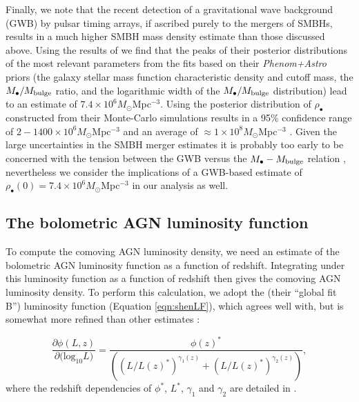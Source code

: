 \documentclass[twocolumn]{aastex631}
\begin{document}
Finally, we note that the recent detection of a gravitational wave background (GWB) by pulsar timing arrays, if ascribed purely to the mergers of SMBHs, results in a much higher SMBH mass density estimate than those discussed above. Using the results of \citet{nanograv23} we find that the peaks of their posterior distributions of the most relevant parameters from the fits based on their {\em Phenom+Astro} priors
(the galaxy stellar mass function characteristic density and cutoff mass, the $M_{\bullet}/M_{\rm bulge}$ ratio, and the logarithmic width of the $M_{\bullet}/M_{\rm bulge}$ distribution) lead to an estimate of $7.4\times 10^6 M_{\odot}$Mpc$^{-3}$. Using the posterior distribution of $\rho_{\bullet}$ constructed from their Monte-Carlo simulations results in a 95\% confidence range of $2-1400 \times 10^6 M_{\odot}$Mpc$^{-3}$ and an average of $\approx 1\times 10^8 M_{\odot}$Mpc$^{-3}$ \citep[we note also that][found a similar result using the earlier 12.5 yr NanoGrav data release]{2022ApJ...924...93C}. Given the large uncertainties in the SMBH merger estimates it is probably too early to be concerned with the tension between the GWB versus the $M_{\bullet} - M_{\rm bulge}$ relation \citep[see][for a discussion of the strength of the tension between the SMBH binary model and the measured GWB in the context of new physics]{2023ApJ...951L..11A}, nevertheless we consider the implications of a GWB-based estimate of $\rho_{\bullet}(0)=7.4\times 10^6 M_{\odot}$Mpc$^{-3}$ in our analysis as well. 


\subsection{The bolometric AGN luminosity function}\label{sec:LF}

To compute the comoving AGN luminosity density, we need an estimate of the bolometric AGN luminosity function as a function of redshift. Integrating under this luminosity function as a function of redshift then gives the comoving AGN luminosity density.  To perform this calculation, we adopt the \citet{2020MNRAS.495.3252S} (their ``global fit B'') luminosity function (Equation \ref{eqn:shenLF}), which agrees well with, but is somewhat more refined than other estimates \citep[e.g.][]{2007ApJ...654..731H,2015ApJ...802..102L,runburg22}:

\begin{equation}\label{eqn:shenLF}
\frac{\partial \phi(L,z)}{\partial\mathrm{(log_{10}}L)}=\frac{\phi(z)^{*}}{((L/L(z)^*)^{\gamma_1(z)}+(L/L(z)^*)^{\gamma_2(z)})},
\end{equation}
where the redshift dependencies of $\phi^{*}$, $L^*$, $\gamma_1$ and $\gamma_2$ are detailed in \citet{2020MNRAS.495.3252S}.
\end{document}
